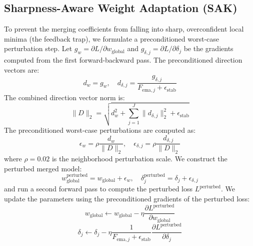 \documentclass{article}
\theoremstyle{plain}
\theoremstyle{definition}
\theoremstyle{remark}
\begin{document}
\subsection{Sharpness-Aware Weight Adaptation (SAK)}
To prevent the merging coefficients from falling into sharp, overconfident local minima (the feedback trap), we formulate a preconditioned worst-case perturbation step. Let $g_w = \partial L / \partial w_{\text{global}}$ and $g_{\delta, j} = \partial L / \partial \delta_j$ be the gradients computed from the first forward-backward pass. The preconditioned direction vectors are:
\begin{equation}
d_w = g_w, \quad d_{\delta, j} = \frac{g_{\delta, j}}{F_{\text{ema}, j} + \epsilon_{\text{stab}}}
\end{equation}
The combined direction vector norm is:
\begin{equation}
\|D\|_2 = \sqrt{d_w^2 + \sum_{j=1}^J \|d_{\delta, j}\|_2^2 + \epsilon_{\text{stab}}}
\end{equation}
The preconditioned worst-case perturbations are computed as:
\begin{equation}
\epsilon_w = \rho \frac{d_w}{\|D\|_2}, \quad \epsilon_{\delta, j} = \rho \frac{d_{\delta, j}}{\|D\|_2}
\end{equation}
where $\rho = 0.02$ is the neighborhood perturbation scale. We construct the perturbed merged model:
\begin{equation}
w_{\text{global}}^{\text{perturbed}} = w_{\text{global}} + \epsilon_w, \quad \delta_j^{\text{perturbed}} = \delta_j + \epsilon_{\delta, j}
\end{equation}
and run a second forward pass to compute the perturbed loss $L^{\text{perturbed}}$. We update the parameters using the preconditioned gradients of the perturbed loss:
\begin{equation}
w_{\text{global}} \leftarrow w_{\text{global}} - \eta \frac{\partial L^{\text{perturbed}}}{\partial w_{\text{global}}}
\end{equation}
\begin{equation}
\delta_j \leftarrow \delta_j - \eta \frac{1}{F_{\text{ema}, j} + \epsilon_{\text{stab}}} \frac{\partial L^{\text{perturbed}}}{\partial \delta_j}
\end{equation}
\end{document}
